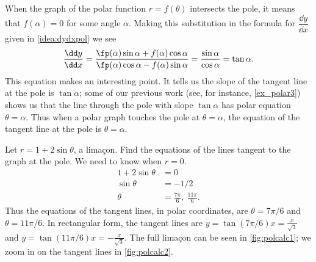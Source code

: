 When the graph of the polar function $r=f(\theta)$ intersects the pole, it means that $f(\alpha) = 0$ for some angle $\alpha$. Making this substitution in the formula for $\dfrac{\dd y}{\dd x}$ given in \autoref{idea:dydxpol} we see
\[
 \frac{\dd y}{\dd x}
 =\frac{\fp(\alpha)\sin\alpha+f(\alpha)\cos\alpha}{\fp(\alpha)\cos\alpha-f(\alpha)\sin\alpha}
 =\frac{\sin\alpha}{\cos\alpha}
 =\tan\alpha.
\]
%
This equation makes an interesting point. It tells us the slope of the tangent line at the pole is $\tan \alpha$; some of our previous work (see, for instance, \autoref{ex_polar3}) shows us that the line through the pole with slope $\tan \alpha$ has polar equation $\theta=\alpha$. Thus when a polar graph touches the pole at $\theta=\alpha$, the equation of the tangent line at the pole is $\theta=\alpha$.

\begin{example}\label{ex_polcalc2}%
Let $r=1+2\sin\theta$, a limaçon. Find the equations of the lines tangent to the graph at the pole.
%
\solution
We need to know when $r=0$. 
\begin{align*}
1+2\sin\theta &= 0\\
\sin\theta &= -1/2\\
\theta &= \frac{7\pi}{6},\ \frac{11\pi}6.
\end{align*}
Thus the equations of the tangent lines, in polar coordinates, are $\theta = 7\pi/6$ and $\theta = 11\pi/6$. In rectangular form, the tangent lines are $y=\tan(7\pi/6)x=\frac x{\sqrt3}$ and $y=\tan(11\pi/6)x=-\frac x{\sqrt3}$. The full limaçon can be seen in \autoref{fig:polcalc1}; we zoom in on the tangent lines in \autoref{fig:polcalc2}.
\end{example}

